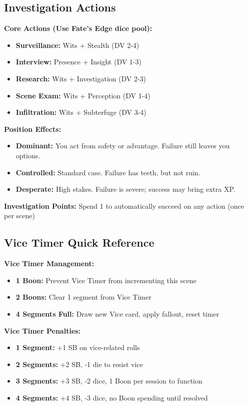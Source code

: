 \documentclass[11pt]{article}
\begin{document}
\subsection{Investigation Actions}

\textbf{Core Actions (Use Fate's Edge dice pool):}
\begin{itemize}
\item \textbf{Surveillance:} Wits + Stealth (DV 2-4)
\item \textbf{Interview:} Presence + Insight (DV 1-3)
\item \textbf{Research:} Wits + Investigation (DV 2-3)
\item \textbf{Scene Exam:} Wits + Perception (DV 1-4)
\item \textbf{Infiltration:} Wits + Subterfuge (DV 3-4)
\end{itemize}

\textbf{Position Effects:}
\begin{itemize}
\item \textbf{Dominant:} You act from safety or advantage. Failure still leaves you options.
\item \textbf{Controlled:} Standard case. Failure has teeth, but not ruin.
\item \textbf{Desperate:} High stakes. Failure is severe; success may bring extra XP.
\end{itemize}

\textbf{Investigation Points:} Spend 1 to automatically succeed on any action (once per scene)

\subsection{Vice Timer Quick Reference}

\textbf{Vice Timer Management:}
\begin{itemize}
\item \textbf{1 Boon:} Prevent Vice Timer from incrementing this scene
\item \textbf{2 Boons:} Clear 1 segment from Vice Timer 
\item \textbf{4 Segments Full:} Draw new Vice card, apply fallout, reset timer
\end{itemize}

\textbf{Vice Timer Penalties:}
\begin{itemize}
\item \textbf{1 Segment:} +1 SB on vice-related rolls
\item \textbf{2 Segments:} +2 SB, -1 die to resist vice
\item \textbf{3 Segments:} +3 SB, -2 dice, 1 Boon per session to function
\item \textbf{4 Segments:} +4 SB, -3 dice, no Boon spending until resolved
\end{itemize}
\end{document}
